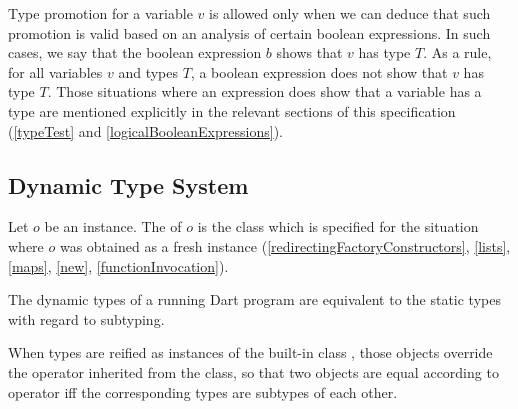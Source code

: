 \documentclass[makeidx]{article}
\begin{document}
{\LMHash{}%
Type promotion for a variable $v$ is allowed only when we can deduce that such promotion is valid based on an analysis of certain boolean expressions.
In such cases, we say that the boolean expression $b$ shows that $v$ has type $T$.
As a rule, for all variables $v$ and types $T$, a boolean expression does not show that $v$ has type $T$.
Those situations where an expression does show that a variable has a type are mentioned explicitly in the relevant sections of this specification (\ref{typeTest} and \ref{logicalBooleanExpressions}).


\subsection{Dynamic Type System}


\LMHash{}%
Let $o$ be an instance.
The  of $o$ is the class which is specified
for the situation where $o$ was obtained as a fresh instance
(\ref{redirectingFactoryConstructors},
\ref{lists}, \ref{maps}, \ref{new}, \ref{functionInvocation}).


\LMHash{}%
The dynamic types of a running Dart program are equivalent to
the static types with regard to subtyping.


\LMHash{}%
When types are reified as instances of the built-in class ,
those objects override the \lit{==} operator
inherited from the  class, so that
two  objects are equal according to operator \lit{==}
if{}f the corresponding types are subtypes of each other.

}
\end{document}

